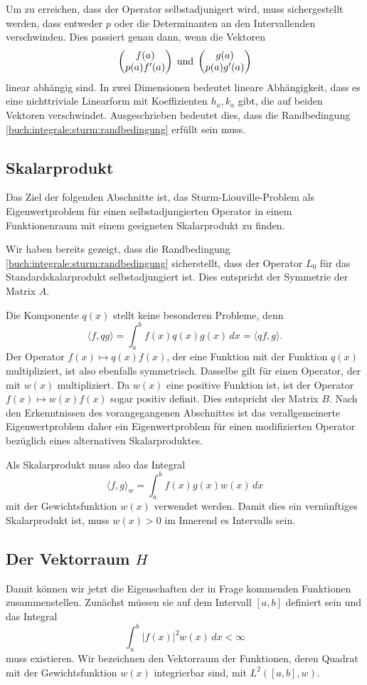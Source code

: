 Um zu erreichen, dass der Operator selbstadjunigert wird, muss 
sichergestellt werden, dass entweder $p$ oder die Determinanten
an den Intervallenden verschwinden.
Dies passiert genau dann, wenn die Vektoren 
\[
\begin{pmatrix}
f(a)\\
p(a)f'(a)
\end{pmatrix}
\text{\;und\;}
\begin{pmatrix}
g(a)\\
p(a)g'(a)
\end{pmatrix}
\]
linear abhängig sind.
In zwei Dimensionen bedeutet lineare Abhängigkeit, dass es
eine nichttriviale Linearform mit Koeffizienten $h_a, k_a$ gibt,
die auf beiden Vektoren verschwindet.
Ausgeschrieben bedeutet dies, dass die Randbedingung
\eqref{buch:integrale:sturm:randbedingung}
erfüllt sein muss.

\subsection{Skalarprodukt}
Das Ziel der folgenden Abschnitte ist, das Sturm-Liouville-Problem als
Eigenwertproblem für einen selbstadjungierten Operator in einem 
Funktionenraum mit einem geeigneten Skalarprodukt zu finden.

Wir haben bereits gezeigt, dass die Randbedingung
\eqref{buch:integrale:sturm:randbedingung} sicherstellt, dass der
Operator $L_0$ für das Standardskalarprodukt selbstadjungiert ist.
Dies entspricht der Symmetrie der Matrix $A$.

Die Komponente $q(x)$ stellt keine besonderen Probleme, denn
\[
\langle f,qg\rangle
=
\int_a^b f(x)q(x)g(x)\,dx
=
\langle qf,g\rangle.
\]
Der Operator $f(x) \mapsto q(x)f(x)$, der eine Funktion mit 
der Funktion $q(x)$ multipliziert, ist also ebenfalls symmetrisch.
Dasselbe gilt für einen Operator, der mit $w(x)$ multipliziert.
Da $w(x)$ eine positive Funktion ist, ist der Operator $f(x)\mapsto w(x)f(x)$
sogar positiv definit.
Dies entspricht der Matrix $B$.
Nach den Erkenntnissen des vorangegangenen Abschnittes ist das
verallgemeinerte Eigenwertproblem daher ein Eigenwertproblem
für einen modifizierten Operator bezüglich eines alternativen
Skalarproduktes.

Als Skalarprodukt muss also das Integral
\[
\langle f,g\rangle_w
=
\int_a^b f(x)g(x)w(x)\,dx
\]
mit der Gewichtsfunktion $w(x)$ verwendet werden.
Damit dies ein vernünftiges Skalarprodukt ist, muss $w(x)>0$ im
Innerend es Intervalls sein.

\subsection{Der Vektorraum $H$}
Damit können wir jetzt die Eigenschaften der in Frage kommenden
Funktionen zusammenstellen.
Zunächst müssen sie auf dem Intervall $[a,b]$ definiert sein und
das Integral
\[
\int_a^b |f(x)|^2 w(x)\,dx < \infty
\]
muss existieren.
Wir bezeichnen den Vektorraum der Funktionen, deren Quadrat mit
der Gewichtsfunktion $w(x)$ integrierbar sind, mit
$L^2([a,b],w)$.

